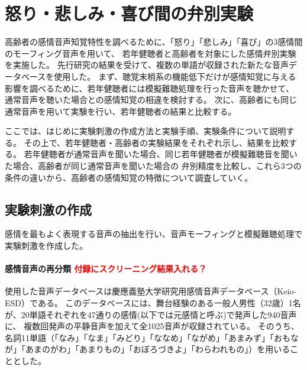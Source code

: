 \newpage
\chapter{怒り・悲しみ・喜び間の弁別実験}
\label{chap:ExpAngHapSad}

高齢者の感情音声知覚特性を調べるために、「怒り」「悲しみ」「喜び」の3感情間のモーフィング音声を用いて、
若年健聴者と高齢者を対象にした感情弁別実験を実施した。
先行研究\cite{hanatani2023Emo}の結果を受けて、複数の単語が収録された新たな音声データベース\cite{keioESD-J}を使用した。
まず、聴覚末梢系の機能低下だけが感情知覚に与える影響を調べるために、若年健聴者には模擬難聴処理を行った音声を聴かせて、
通常音声を聴いた場合との感情知覚の相違を検討する。
次に、高齢者にも同じ通常音声を用いて実験を行い、若年健聴者の結果と比較する。

ここでは、はじめに実験刺激の作成方法と実験手順、実験条件について説明する。
その上で、若年健聴者・高齢者の実験結果をそれぞれ示し、結果を比較する。
若年健聴者が通常音声を聞いた場合、同じ若年健聴者が模擬難聴音を聞いた場合、高齢者が同じ通常音声を聞いた場合の
弁別精度を比較し、これら3つの条件の違いから、高齢者の感情知覚の特徴について調査していく。

\section{実験刺激の作成}
\label{sec:PrepareStimuli}
感情を最もよく表現する音声の抽出を行い、音声モーフィングと模擬難聴処理で実験刺激を作成した。

\subsubsection{感情音声の再分類 \textcolor{red}{付録にスクリーニング結果入れる？}}
使用した音声データベースは慶應義塾大学研究用感情音声データベース（Keio-ESD）\cite{keioESD-J}である。
このデータベースには、舞台経験のある一般人男性（32歳）1名が、20単語それぞれを47通りの感情(以下では元感情と呼ぶ)で発声した940音声に、
複数回発声の平静音声を加えて全1025音声が収録されている。
そのうち、名詞11単語（「なみ」「なま」「みどり」「ななめ」「ながめ」「あまみず」「おもなが」「あまのがわ」「あまりもの」「おぼろづきよ」「わらわれもの」）を用いることとした。


